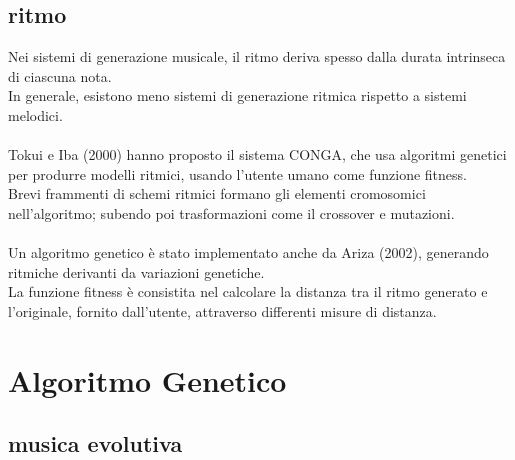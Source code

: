 \documentclass[a4paper,12pt]{report}
\begin{document}
\subsection{ritmo}

Nei sistemi di generazione musicale, il ritmo deriva spesso dalla durata intrinseca di ciascuna nota. \\
In generale, esistono meno sistemi di generazione ritmica rispetto a sistemi melodici. \\
\\
Tokui e Iba (2000) hanno proposto il sistema CONGA, che usa algoritmi genetici per produrre modelli ritmici, usando l'utente umano come funzione fitness. \\
Brevi frammenti di schemi ritmici formano gli elementi cromosomici nell'algoritmo; subendo poi trasformazioni come il crossover e mutazioni. \\
\\
Un algoritmo genetico è stato implementato anche da Ariza (2002), generando ritmiche derivanti da variazioni genetiche. \\
La funzione fitness è consistita nel calcolare la distanza tra il ritmo generato e l'originale, fornito dall'utente, attraverso differenti misure di distanza. 

\section{Algoritmo Genetico}

\subsection{musica evolutiva}
\end{document}
